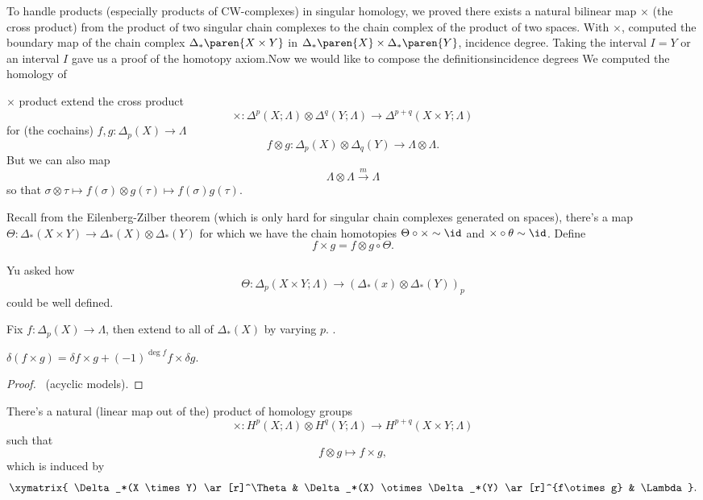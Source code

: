 To handle products (especially products of CW-complexes) in singular homology, we proved there exists a natural bilinear map $\times$ (the cross product) from the product of two singular chain complexes to the chain complex of the product of two spaces. 
With $\times$, computed the boundary map of the chain complex ${\Delta}_{*}\paren{X \times Y}$ in  ${\Delta}_{*}\paren{X} \times {\Delta}_{*}\paren{Y}$, incidence degree. 
Taking the interval $I = Y$ or an interval $I$ gave us a proof of the homotopy axiom.Now we would like to compose the definitionsincidence degrees
We computed the homology of 
\begin{defn}[]
    $\times$ product extend the cross product
        $$\times \colon \Delta^p (X; \Lambda) \otimes \Delta^q (Y; \Lambda) \to \Delta^{p+q}(X\times Y; \Lambda)$$ 
    for (the cochains) $f, g \colon \Delta_p (X) \to \Lambda$ 
        $$f \otimes g \colon \Delta_p(X) \otimes \Delta_q(Y) \to \Lambda \otimes \Lambda.$$
    But we can also map 
        $$\Lambda \otimes \Lambda \xrightarrow{m} \Lambda$$ 
    so that $\sigma \otimes \tau \mapsto f(\sigma) \otimes g(\tau) \mapsto f(\sigma) g(\tau)$.
\end{defn}

Recall from the Eilenberg-Zilber theorem (which is only hard for singular chain complexes generated on spaces), there's a map $\Theta \colon \Delta_*(X \times Y) \to \Delta_*(X) \otimes \Delta_*(Y)$ for which we have the chain homotopies $\Theta \circ \times \sim \id$ and $\times \circ \theta \sim \id$. 
Define
    $$f \times g = f\otimes g \circ \Theta.$$

\begin{rem}[]
    Yu asked how $$\Theta \colon \Delta_p(X\times Y; \Lambda) \to (\Delta_*(x) \otimes \Delta_*(Y))_p$$ could be well defined.
    
    Fix $f \colon \Delta_p(X) \to \Lambda$, then extend to all of $\Delta_*(X)$ by varying $p$. \TODO.
\end{rem}

\begin{lem}[]
    $\delta (f \times g)  = \delta f \times g + (-1)^{\deg f} f \times \delta g$.
\end{lem}

\begin{proof}
\TODO\ (acyclic models).
\end{proof}

\begin{fact}[]
There's a natural (linear map out of the) product of homology groups
     $$\times \colon H^p(X; \Lambda) \otimes H^q(Y; \Lambda) 
         \to H^{p+q}(X \times Y; \Lambda)$$
such that 
     $$f \otimes g \mapsto f \times g,$$
which is induced by
$$\xymatrix{
    \Delta_*(X \times Y) \ar[r]^\Theta &
        \Delta_*(X) \otimes \Delta_*(Y) \ar[r]^{f\otimes g} &
        \Lambda
}.$$
\end{fact}

